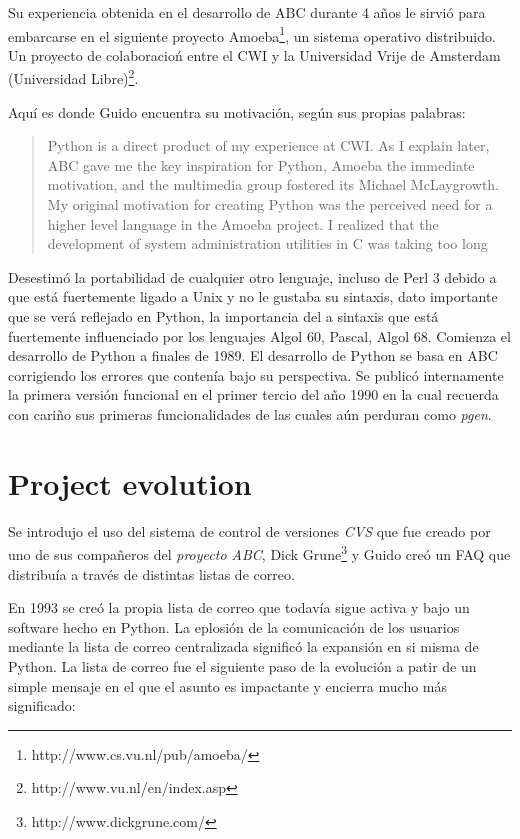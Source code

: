 \documentclass[11pt]{scrartcl}
\begin{document}
Su experiencia obtenida en el desarrollo de ABC durante 4 años le sirvió para embarcarse en el siguiente proyecto Amoeba\footnote{http://www.cs.vu.nl/pub/amoeba/}, un sistema operativo distribuido. Un proyecto de colaboracioń entre el CWI y la Universidad Vrije de Amsterdam (Universidad Libre)\footnote{http://www.vu.nl/en/index.asp}.

Aquí es donde Guido encuentra su motivación, según sus propias palabras:
\begin{quotation}
    Python is a direct product of my experience at CWI. As I explain later, ABC gave me the key inspiration for Python, Amoeba the immediate motivation, and the multimedia group fostered its Michael McLaygrowth.\\

    My original motivation for creating Python was the perceived need for a higher level language in the Amoeba project. I realized that the development of system administration utilities in C was taking too long
\end{quotation}

Desestimó la portabilidad de cualquier otro lenguaje, incluso de Perl 3 debido a que está fuertemente ligado a Unix y no le gustaba su sintaxis, dato importante que se verá reflejado en Python, la importancia del a sintaxis que está fuertemente influenciado por los lenguajes Algol 60, Pascal, Algol 68.
Comienza el desarrollo de Python a finales de 1989. El desarrollo de Python se basa en ABC corrigiendo los errores que contenía bajo su perspectiva. Se publicó internamente la primera versión funcional en el primer tercio del año 1990 en la cual recuerda con cariño sus primeras funcionalidades de las cuales aún perduran como \emph{pgen}.

\section{Project evolution}

Se introdujo el uso del sistema de control de versiones \emph{CVS} que fue creado por uno de sus compañeros del \emph{proyecto ABC}, Dick Grune\footnote{http://www.dickgrune.com/} y Guido creó un FAQ que distribuía a través de distintas listas de correo.

En 1993 se creó la propia lista de correo que todavía sigue activa y bajo un software hecho en Python. La eplosión de la comunicación de los usuarios mediante la lista de correo centralizada significó la expansión en si misma de Python. La lista de correo fue el siguiente paso de la evolución a patir de un simple mensaje en el que el asunto es impactante y encierra mucho más significado:
\end{document}
